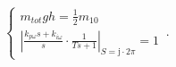 \begin{equation}
    \begin{cases}
      m_{tot} g h = \frac{1}{2} m_ 10\\
      \left\lvert\frac{k_{p\omega}s+k_{i\omega}}{s}\cdot\frac{1}{Ts+1}\right\rvert_{S=\mathrm{j}\cdot2\pi}=1
    \end{cases}\,.
\end{equation}